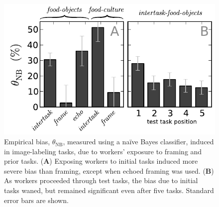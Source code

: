 \documentclass{sigchi}
\begin{document}
\begin{figure}
	\includegraphics[scale=0.75]{figs/theta.pdf}
	\caption{
		Empirical bias, $\theta_\mathrm{NB}$, measured using a na\"ive Bayes 
		classifier, induced in image-labeling tasks, due to workers' 
		exposure to framing and prior tasks.  
		(\textbf{A}) Exposing workers to initial tasks induced more severe
		bias than framing, except when echoed framing was used. 
		(\textbf{B}) As workers proceeded through test tasks, 
		the bias due to initial tasks waned, 
		but remained significant even after five tasks.  
		Standard error bars are shown.
	}
	\label{fig:theta}
\end{figure}
\end{document}
